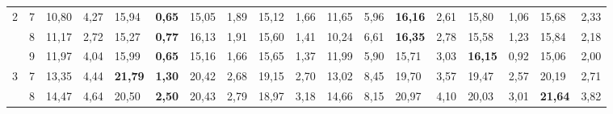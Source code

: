 \documentclass[conference]{IEEEtran}
\begin{document}
\begin{table}[]
\begin{tabular}{|cl|ll|ll|ll|ll|ll|ll|ll|ll|}
		\multicolumn{1}{|c|}{\multirow{3}{*}{2}}  & 7          & \multicolumn{1}{l|}{10,80}         & 4,27          & \multicolumn{1}{l|}{15,94}          & \textbf{0,65} & \multicolumn{1}{l|}{15,05}          & 1,89          & \multicolumn{1}{l|}{15,12}         & 1,66          & \multicolumn{1}{l|}{11,65}                & 5,96 & \multicolumn{1}{l|}{\textbf{16,16}} & 2,61 & \multicolumn{1}{l|}{15,80}          & 1,06          & \multicolumn{1}{l|}{15,68}          & 2,33 \\ \cline{2-18} 
		\multicolumn{1}{|c|}{}                    & 8          & \multicolumn{1}{l|}{11,17}         & 2,72          & \multicolumn{1}{l|}{15,27}          & \textbf{0,77} & \multicolumn{1}{l|}{16,13}          & 1,91          & \multicolumn{1}{l|}{15,60}         & 1,41          & \multicolumn{1}{l|}{10,24}                & 6,61 & \multicolumn{1}{l|}{\textbf{16,35}} & 2,78 & \multicolumn{1}{l|}{15,58}          & 1,23          & \multicolumn{1}{l|}{15,84}          & 2,18 \\ \cline{2-18} 
		\multicolumn{1}{|c|}{}                    & 9          & \multicolumn{1}{l|}{11,97}         & 4,04          & \multicolumn{1}{l|}{15,99}          & \textbf{0,65} & \multicolumn{1}{l|}{15,16}          & 1,66          & \multicolumn{1}{l|}{15,65}         & 1,37          & \multicolumn{1}{l|}{11,99}                & 5,90 & \multicolumn{1}{l|}{15,71}          & 3,03 & \multicolumn{1}{l|}{\textbf{16,15}} & 0,92          & \multicolumn{1}{l|}{15,06}          & 2,00 \\ \hline
		\multicolumn{1}{|c|}{\multirow{3}{*}{3}}  & 7          & \multicolumn{1}{l|}{13,35}         & 4,44          & \multicolumn{1}{l|}{\textbf{21,79}} & \textbf{1,30} & \multicolumn{1}{l|}{20,42}          & 2,68          & \multicolumn{1}{l|}{19,15}         & 2,70          & \multicolumn{1}{l|}{13,02}                & 8,45 & \multicolumn{1}{l|}{19,70}          & 3,57 & \multicolumn{1}{l|}{19,47}          & 2,57          & \multicolumn{1}{l|}{20,19}          & 2,71 \\ \cline{2-18} 
		\multicolumn{1}{|c|}{}                    & 8          & \multicolumn{1}{l|}{14,47}         & 4,64          & \multicolumn{1}{l|}{20,50}          & \textbf{2,50} & \multicolumn{1}{l|}{20,43}          & 2,79          & \multicolumn{1}{l|}{18,97}         & 3,18          & \multicolumn{1}{l|}{14,66}                & 8,15 & \multicolumn{1}{l|}{20,97}          & 4,10 & \multicolumn{1}{l|}{20,03}          & 3,01          & \multicolumn{1}{l|}{\textbf{21,64}} & 3,82 \\ \cline{2-18} 

\end{tabular}
\end{table}
\end{document}
